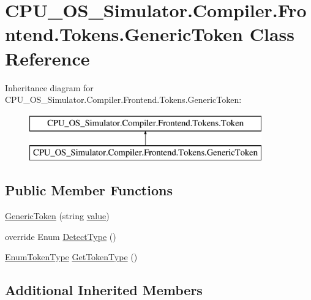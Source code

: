 \hypertarget{class_c_p_u___o_s___simulator_1_1_compiler_1_1_frontend_1_1_tokens_1_1_generic_token}{}\section{C\+P\+U\+\_\+\+O\+S\+\_\+\+Simulator.\+Compiler.\+Frontend.\+Tokens.\+Generic\+Token Class Reference}
\label{class_c_p_u___o_s___simulator_1_1_compiler_1_1_frontend_1_1_tokens_1_1_generic_token}
Inheritance diagram for C\+P\+U\+\_\+\+O\+S\+\_\+\+Simulator.\+Compiler.\+Frontend.\+Tokens.\+Generic\+Token\+:\begin{figure}[H]
\begin{center}
\leavevmode
\includegraphics[height=2.000000cm]{class_c_p_u___o_s___simulator_1_1_compiler_1_1_frontend_1_1_tokens_1_1_generic_token}
\end{center}
\end{figure}
\subsection*{Public Member Functions}
\begin{DoxyCompactItemize}
\item 
\hyperlink{class_c_p_u___o_s___simulator_1_1_compiler_1_1_frontend_1_1_tokens_1_1_generic_token_a22ff9b77e796d56abfe9fe433526bfed}{Generic\+Token} (string \hyperlink{class_c_p_u___o_s___simulator_1_1_compiler_1_1_frontend_1_1_tokens_1_1_token_a5c05e12850ca18be8cbfdf7e2e263324}{value})
\item 
override Enum \hyperlink{class_c_p_u___o_s___simulator_1_1_compiler_1_1_frontend_1_1_tokens_1_1_generic_token_ae835f3a63c88a7e73df243c510cb0142}{Detect\+Type} ()
\item 
\hyperlink{namespace_c_p_u___o_s___simulator_1_1_compiler_1_1_frontend_1_1_tokens_a95401dcaadc07640b0e77238808e5aed}{Enum\+Token\+Type} \hyperlink{class_c_p_u___o_s___simulator_1_1_compiler_1_1_frontend_1_1_tokens_1_1_generic_token_a24e1310c91e1f75821a5a68ae1607732}{Get\+Token\+Type} ()
\end{DoxyCompactItemize}
\subsection*{Additional Inherited Members}


